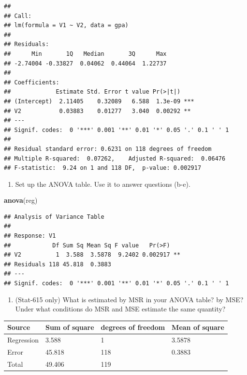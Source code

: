 \documentclass[
]{article}
\newenvironment{Shaded}{\begin{snugshade}}{\end{snugshade}}
\newcommand{\KeywordTok}[1]{\textcolor[rgb]{0.13,0.29,0.53}{\textbf{#1}}}
\newcommand{\NormalTok}[1]{#1}
\providecommand{\tightlist}{%
  \setlength{\itemsep}{0pt}\setlength{\parskip}{0pt}}
\begin{document}
\begin{verbatim}
## 
## Call:
## lm(formula = V1 ~ V2, data = gpa)
## 
## Residuals:
##      Min       1Q   Median       3Q      Max 
## -2.74004 -0.33827  0.04062  0.44064  1.22737 
## 
## Coefficients:
##             Estimate Std. Error t value Pr(>|t|)    
## (Intercept)  2.11405    0.32089   6.588  1.3e-09 ***
## V2           0.03883    0.01277   3.040  0.00292 ** 
## ---
## Signif. codes:  0 '***' 0.001 '**' 0.01 '*' 0.05 '.' 0.1 ' ' 1
## 
## Residual standard error: 0.6231 on 118 degrees of freedom
## Multiple R-squared:  0.07262,    Adjusted R-squared:  0.06476 
## F-statistic:  9.24 on 1 and 118 DF,  p-value: 0.002917
\end{verbatim}

\begin{enumerate}
\def\labelenumi{(\alph{enumi})}
\tightlist
\item
  Set up the ANOVA table. Use it to answer questions (b-e).
\end{enumerate}

\begin{Shaded}
\begin{Highlighting}[]
\KeywordTok{anova}\NormalTok{(reg)}
\end{Highlighting}
\end{Shaded}

\begin{verbatim}
## Analysis of Variance Table
## 
## Response: V1
##            Df Sum Sq Mean Sq F value   Pr(>F)   
## V2          1  3.588  3.5878  9.2402 0.002917 **
## Residuals 118 45.818  0.3883                    
## ---
## Signif. codes:  0 '***' 0.001 '**' 0.01 '*' 0.05 '.' 0.1 ' ' 1
\end{verbatim}

\begin{enumerate}
\def\labelenumi{(\alph{enumi})}
\setcounter{enumi}{1}
\tightlist
\item
  (Stat-615 only) What is estimated by MSR in your ANOVA table? by MSE?
  Under what conditions do MSR and MSE estimate the same quantity?\\
\end{enumerate}

\begin{longtable}[]{@{}llll@{}}
\toprule
Source & Sum of square & degrees of freedom & Mean of
square\tabularnewline
\midrule
\endhead
Regression & 3.588 & 1 & 3.5878\tabularnewline
Error & 45.818 & 118 & 0.3883\tabularnewline
Total & 49.406 & 119 &\tabularnewline
\bottomrule
\end{longtable}
\end{document}
